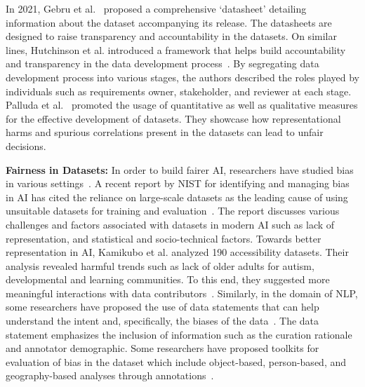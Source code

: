 \documentclass[journal]{IEEEtran}
\begin{document}
In 2021, Gebru et al.~\cite{gebru2021datasheets} proposed a comprehensive `datasheet' detailing information about the dataset accompanying its release. The datasheets are designed to raise transparency and accountability in the datasets. On similar lines, Hutchinson et al. introduced a framework that helps build accountability and transparency in the data development process~\cite{hutchinson2021towards}. By segregating data development process into various stages, the authors described the roles played by individuals such as requirements owner, stakeholder, and reviewer at each stage. Palluda et al.~\cite{paullada2021data} promoted the usage of quantitative as well as qualitative measures for the effective development of datasets. They showcase how representational harms and spurious correlations present in the datasets can lead to unfair decisions.

\noindent \textbf{Fairness in Datasets:} In order to build fairer AI, researchers have studied bias in various settings~\cite{tommasi2017deeper, yangfei2020towards, de2019does, singh2022anatomizing}. A recent report by NIST for identifying and managing bias in AI has cited the reliance on large-scale datasets as the leading cause of using unsuitable datasets for training and evaluation~\cite{schwartz2022towards}. The report discusses various challenges and factors associated with datasets in modern AI such as lack of representation, and statistical and socio-technical factors. Towards better representation in AI, Kamikubo et al. analyzed 190 accessibility datasets. Their analysis revealed harmful trends such as lack of older adults for autism, developmental and learning communities. To this end, they suggested more meaningful interactions with data contributors~\cite{kamikubo2022data}. Similarly, in the domain of NLP, some researchers have proposed the use of data statements that can help understand the intent and, specifically, the biases of the data~\cite{bender2018data}. The data statement emphasizes the inclusion of information such as the curation rationale and annotator demographic. Some researchers have proposed toolkits for evaluation of bias in the dataset which include object-based, person-based, and geography-based analyses through annotations~\cite{wang2022revise}.
\end{document}
